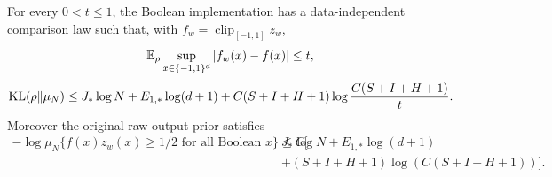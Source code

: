 \begin{lemma}
\label{lem:digital-comparison}
For every $0<t\le1$, the Boolean implementation has a data-independent comparison law such that, with $f_w=\operatorname{clip}_{[-1,1]}z_w$,
\[
 \mathbb E_\rho\sup_{x\in\{-1,1\}^d}|f_w(x)-f(x)|\le t,
\]
\begin{equation}
 \operatorname{KL}(\rho\|\mu_N)
 \le J_*\log N+E_{1,*}\log(d+1)
       +C(S+I+H+1)\log\frac{C(S+I+H+1)}t.
 \label{eq:digital-entropy}
\end{equation}
Moreover the original raw-output prior satisfies
\begin{equation}\begin{aligned}
 -\log\mu_N\{f(x)z_w(x)\ge1/2\text{ for all Boolean }x\}
 \le C\big[&J_*\log N+E_{1,*}\log(d+1)\\
       &+(S+I+H+1)\log(C(S+I+H+1))\big].
 \end{aligned}\label{eq:digital-margin-mass}
\end{equation}
\end{lemma}
